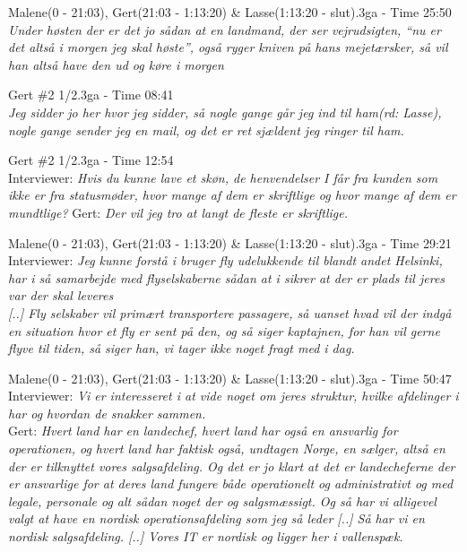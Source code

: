 \begin{thebibliography}{9}
	Malene(0 - 21:03), Gert(21:03 - 1:13:20) \& Lasse(1:13:20 - slut).3ga - Time 25:50\\
	\textit{Under høsten der er det jo sådan at en landmand, der ser vejrudsigten, “nu er det altså i morgen jeg skal høste”, også ryger kniven på hans mejetærsker, så vil han altså have den ud og køre i morgen}

	Gert \#2 1/2.3ga - Time 08:41\\
	\textit{Jeg sidder jo her hvor jeg sidder, så nogle gange går jeg ind til ham\emph{(rd: Lasse)}, nogle gange sender jeg en mail, og det er ret sjældent jeg ringer til ham.}

	Gert \#2 1/2.3ga - Time 12:54\\
	Interviewer: \textit{Hvis du kunne lave et skøn, de henvendelser I får fra kunden som ikke er fra statusmøder, hvor mange af dem er skriftlige og hvor mange af dem er mundtlige?} Gert: \textit{Der vil jeg tro at langt de fleste er skriftlige.}

	Malene(0 - 21:03), Gert(21:03 - 1:13:20) \& Lasse(1:13:20 - slut).3ga - Time 29:21\\
	Interviewer: \textit{Jeg kunne forstå i bruger fly udelukkende til blandt andet Helsinki, har i så samarbejde med flyselskaberne sådan at i sikrer at der er plads til jeres var der skal leveres}\\
	\textit{[..] Fly selskaber vil primært transportere passagere, så uanset hvad vil der indgå en situation hvor et fly er sent på den, og så siger kaptajnen, for han vil gerne flyve til tiden, så siger han, vi tager ikke noget fragt med i dag.}

	Malene(0 - 21:03), Gert(21:03 - 1:13:20) \& Lasse(1:13:20 - slut).3ga - Time 50:47\\
	Interviewer: \textit{Vi er interesseret i at vide noget om jeres struktur, hvilke afdelinger i har og hvordan de snakker sammen.}\\
	Gert: \textit{Hvert land har en landechef, hvert land har også en ansvarlig for operationen, og hvert land har faktisk også, undtagen Norge, en sælger, altså en der er tilknyttet vores salgsafdeling. Og det er jo klart at det er landecheferne der er ansvarlige for at deres land fungere både operationelt og administrativt og med legale, personale og alt sådan noget der og salgsmæssigt. Og så har vi alligevel valgt at have en nordisk operationsafdeling som jeg så leder [..] Så har vi en nordisk salgsafdeling. [..] Vores IT er nordisk og ligger her i vallenspæk. }


\end{thebibliography}
